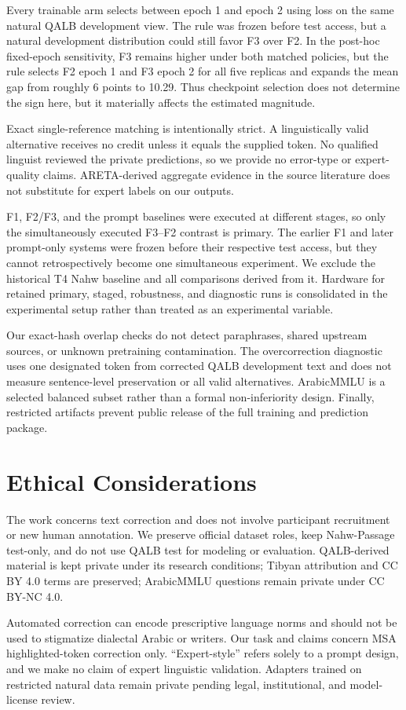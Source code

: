 \documentclass[11pt,a4paper]{article}
\begin{document}
Every trainable arm selects between epoch 1 and epoch 2 using loss on the same
natural QALB development view.  The rule was frozen before test access, but a
natural development distribution could still favor F3 over F2.  In the
post-hoc fixed-epoch sensitivity, F3 remains higher under both matched policies,
but the rule selects F2 epoch 1 and F3 epoch 2 for all five replicas and expands
the mean gap from roughly 6 points to 10.29.  Thus checkpoint selection does
not determine the sign here, but it materially affects the estimated magnitude.

Exact single-reference matching is intentionally strict.  A linguistically
valid alternative receives no credit unless it equals the supplied token.
No qualified linguist reviewed the private predictions, so we provide no
error-type or expert-quality claims.  ARETA-derived aggregate evidence in the
source literature does not substitute for expert labels on our outputs.

F1, F2/F3, and the prompt baselines were executed at different stages, so only
the simultaneously executed F3--F2 contrast is primary.  The earlier F1 and
later prompt-only systems were frozen before their respective test access, but
they cannot retrospectively become one simultaneous experiment.  We exclude
the historical T4 Nahw baseline and all comparisons derived from it.  Hardware
for retained primary, staged, robustness, and diagnostic runs is consolidated
in the experimental setup rather than treated as an experimental variable.

Our exact-hash overlap checks do not detect paraphrases, shared upstream
sources, or unknown pretraining contamination.  The overcorrection diagnostic
uses one designated token from corrected QALB development text and does not
measure sentence-level preservation or all valid alternatives.  ArabicMMLU is
a selected balanced subset rather than a formal non-inferiority design.
Finally, restricted artifacts prevent public release of the full training and
prediction package.

\section{Ethical Considerations}

The work concerns text correction and does not involve participant recruitment
or new human annotation.  We preserve official dataset roles, keep
Nahw-Passage test-only, and do not use QALB test for modeling or evaluation.
QALB-derived material is kept private under its research conditions; Tibyan
attribution and CC BY 4.0 terms are preserved; ArabicMMLU questions remain
private under CC BY-NC 4.0.

Automated correction can encode prescriptive language norms and should not be
used to stigmatize dialectal Arabic or writers.  Our task and claims concern
MSA highlighted-token correction only.  ``Expert-style'' refers solely to a
prompt design, and we make no claim of expert linguistic validation.  Adapters
trained on restricted natural data remain private pending legal,
institutional, and model-license review.


\end{document}
